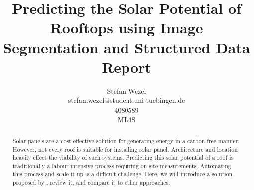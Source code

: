 \documentclass{article} %
\title{Predicting the Solar Potential of Rooftops using
	Image Segmentation and Structured Data\\ \vspace{0.5cm}\large{Report}}
\author{Stefan Wezel \\ stefan.wezel@student.uni-tuebingen.de \\4080589  \\ ML4S}
\def\figwidth{.5\linewidth}
\def\figheight{.15\textheight}
\begin{document}
\maketitle

\begin{abstract}
	Solar panels are a cost effective solution for generating energy in a carbon-free manner. However, not every roof is suitable for installing solar panel. Architecture and location heavily effect the viability of such systems.
	Predicting this solar potential of a roof is traditionally a labour intensive process requiring on site measurements. Automating this process and scale it up is a difficult challenge. Here, we will introduce a solution proposed by \citet{de2021predicting}, review it, and compare it to other approaches.
\end{abstract}
\end{document}
